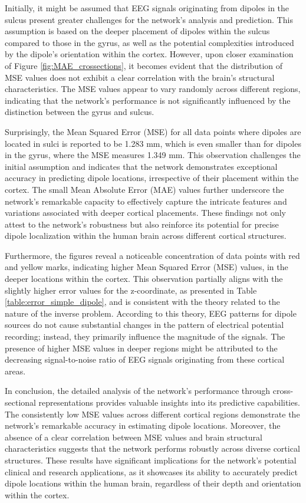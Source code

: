 \documentclass[a4paper, UKenglish, 11pt]{uiomaster}
\begin{document}
Initially, it might be assumed that EEG signals originating from dipoles in the sulcus present greater challenges for the network's analysis and prediction. This assumption is based on the deeper placement of dipoles within the sulcus compared to those in the gyrus, as well as the potential complexities introduced by the dipole's orientation within the cortex. However, upon closer examination of Figure \ref{fig:MAE_crossections}, it becomes evident that the distribution of MSE values does not exhibit a clear correlation with the brain's structural characteristics. The MSE values appear to vary randomly across different regions, indicating that the network's performance is not significantly influenced by the distinction between the gyrus and sulcus.

Surprisingly, the Mean Squared Error (MSE) for all data points where dipoles are located in sulci is reported to be 1.283 mm, which is even smaller than for dipoles in the gyrus, where the MSE measures 1.349 mm. This observation challenges the initial assumption and indicates that the network demonstrates exceptional accuracy in predicting dipole locations, irrespective of their placement within the cortex. The small Mean Absolute Error (MAE) values further underscore the network's remarkable capacity to effectively capture the intricate features and variations associated with deeper cortical placements. These findings not only attest to the network's robustness but also reinforce its potential for precise dipole localization within the human brain across different cortical structures.

Furthermore, the figures reveal a noticeable concentration of data points with red and yellow marks, indicating higher Mean Squared Error (MSE) values, in the deeper locations within the cortex. This observation partially aligns with the slightly higher error values for the z-coordinate, as presented in Table \ref{table:error_simple_dipole}, and is consistent with the theory related to the nature of the inverse problem. According to this theory, EEG patterns for dipole sources do not cause substantial changes in the pattern of electrical potential recording; instead, they primarily influence the magnitude of the signals. The presence of higher MSE values in deeper regions might be attributed to the decreasing signal-to-noise ratio of EEG signals originating from these cortical areas.

In conclusion, the detailed analysis of the network's performance through cross-sectional representations provides valuable insights into its predictive capabilities. The consistently low MSE values across different cortical regions demonstrate the network's remarkable accuracy in estimating dipole locations. Moreover, the absence of a clear correlation between MSE values and brain structural characteristics suggests that the network performs robustly across diverse cortical structures. These results have significant implications for the network's potential clinical and research applications, as it showcases its ability to accurately predict dipole locations within the human brain, regardless of their depth and orientation within the cortex.
\end{document}
